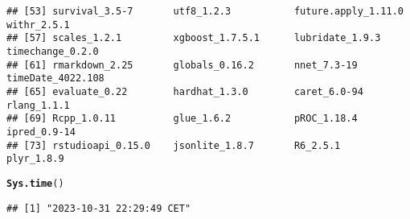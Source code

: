 \documentclass{article}\usepackage[]{graphicx}\usepackage[]{xcolor}
\makeatletter
\newcommand{\hlstd}[1]{\textcolor[rgb]{0.345,0.345,0.345}{#1}}%
\newcommand{\hlkwd}[1]{\textcolor[rgb]{0.737,0.353,0.396}{\textbf{#1}}}%
\newenvironment{kframe}{%
 \def\at@end@of@kframe{}%
 \ifinner\ifhmode%
  \def\at@end@of@kframe{\end{minipage}}%
  \begin{minipage}{\columnwidth}%
 \fi\fi%
 \def\FrameCommand##1{\hskip\@totalleftmargin \hskip-\fboxsep
 \colorbox{shadecolor}{##1}\hskip-\fboxsep
     \hskip-\linewidth \hskip-\@totalleftmargin \hskip\columnwidth}%
 \MakeFramed {\advance\hsize-\width
   \@totalleftmargin\z@ \linewidth\hsize
   \@setminipage}}%
 {\par\unskip\endMakeFramed%
 \at@end@of@kframe}
\newenvironment{knitrout}{}{} %
\makeatother
\begin{document}
\begin{knitrout}
\begin{kframe}
\begin{verbatim}
## [53] survival_3.5-7       utf8_1.2.3           future.apply_1.11.0  withr_2.5.1         
## [57] scales_1.2.1         xgboost_1.7.5.1      lubridate_1.9.3      timechange_0.2.0    
## [61] rmarkdown_2.25       globals_0.16.2       nnet_7.3-19          timeDate_4022.108   
## [65] evaluate_0.22        hardhat_1.3.0        caret_6.0-94         rlang_1.1.1         
## [69] Rcpp_1.0.11          glue_1.6.2           pROC_1.18.4          ipred_0.9-14        
## [73] rstudioapi_0.15.0    jsonlite_1.8.7       R6_2.5.1             plyr_1.8.9
\end{verbatim}
\begin{alltt}
\hlkwd{Sys.time}\hlstd{()}
\end{alltt}
\begin{verbatim}
## [1] "2023-10-31 22:29:49 CET"
\end{verbatim}
\end{kframe}
\end{knitrout}
\end{document}
